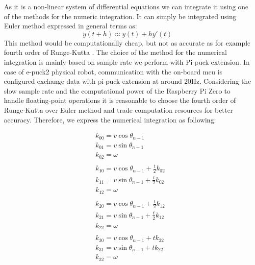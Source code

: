 As it is a non-linear system of differential equations we can integrate it using one of the methods for the numeric integration. It can simply be integrated using Euler method expressed in general terms as:
\begin{equation}
    y(t + h) \approx y(t) + h y'(t)
\end{equation}
This method would be computationally cheap, but not as accurate as for example fourth order of Runge-Kutta \cite[p. 40]{noauthor_solving_1993}. The choice of the method for the numerical integration is mainly based on sample rate we perform with Pi-puck extension. In case of e-puck2 physical robot, communication with the on-board \ac{mcu} is configured exchange data with pi-puck extension at around 20Hz. Considering the slow sample rate and the computational power of the Raspberry Pi Zero to handle floating-point operations it is reasonable to choose the fourth order of Runge-Kutta over Euler method and trade computation resources for better accuracy. Therefore, we express the numerical integration as following:


\begin{equation}
\begin{aligned}
    & k_{00} = v \cos{\theta_{n-1}} \\
    & k_{01} = v \sin{\theta_{n-1}} \\
    & k_{02} = \omega \\
    & \\
    & k_{10} = v \cos{\theta_{n-1} + \frac{t}{2}k_{02}} \\
    & k_{11} = v \sin{\theta_{n-1} + \frac{t}{2}k_{02}} \\
    & k_{12} = \omega \\
    & \\
    & k_{20} = v \cos{\theta_{n-1} + \frac{t}{2}k_{12}} \\
    & k_{21} = v \sin{\theta_{n-1} + \frac{t}{2}k_{12}} \\
    & k_{22} = \omega \\
    & \\
    & k_{30} = v \cos{\theta_{n-1} + t k_{22}} \\
    & k_{31} = v \sin{\theta_{n-1} + t k_{22}} \\
    & k_{32} = \omega
\end{aligned}
\end{equation}

